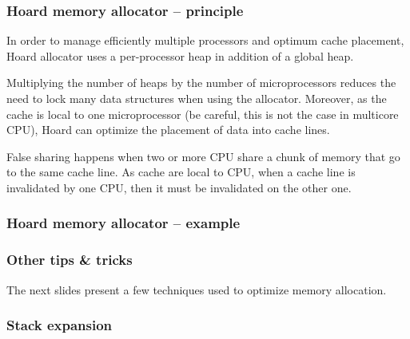 \begin{frame}
  \frametitle{Hoard memory allocator -- principle}

  In order to manage efficiently multiple processors and optimum cache
  placement, Hoard allocator uses a per-processor heap in addition of
  a global heap.

  \-

  Multiplying the number of heaps by the number of microprocessors
  reduces the need to lock many data structures when using the
  allocator. Moreover, as the cache is local to one microprocessor (be
  careful, this is not the case in multicore CPU), Hoard can optimize
  the placement of data into cache lines.

  \-

  False sharing happens when two or more CPU share a chunk of memory
  that go to the same cache line. As cache are local to CPU, when a
  cache line is invalidated by one CPU, then it must be invalidated on
  the other one.

  \begin{center}
  \end{center}

\end{frame}


\begin{frame}
  \frametitle{Hoard memory allocator -- example}

  \begin{center}
  \end{center}

\end{frame}


\begin{frame}
  \frametitle{Other tips \& tricks}

  The next slides present a few techniques used to optimize memory
  allocation.

\end{frame}


\begin{frame}
  \frametitle{Stack expansion}

  \begin{center}
  \end{center}

\end{frame}

